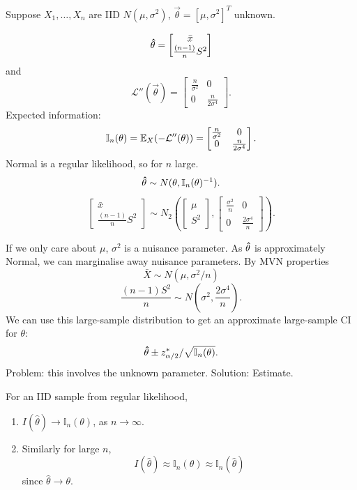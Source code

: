 \documentclass[10pt, a4paper]{article}
\begin{document}
\begin{example}
    Suppose $X_1, \dotsc, X_n$ are IID $N(\mu, \sigma ^ 2)$,
    $\vec{\theta} = [\mu, \sigma ^ 2] ^ T$ unknown.

    \[
    \mathbf{\hat{\theta}} = \begin{bmatrix}
        \bar{x} \\
        \frac{(n - 1)}{n}S ^ 2
    \end{bmatrix}
    \]
    and
    \[
    \mathcal{L}''(\vec{\theta}) = \begin{bmatrix}
        \frac{n}{\sigma ^ 2} & 0 \\ 0 & \frac{n}{2\sigma ^ 4}
    \end{bmatrix}.
    \]
    Expected information:
    \[
    \mathbb{I}_n(\mathbf{\theta}) = \mathbb{E}_{X}(-\mathcal{L}''(\mathbf{\theta})) = \begin{bmatrix}
        \frac{n}{\sigma ^ 2} & 0 \\ 0 & \frac{n}{2\sigma ^ 4}
    \end{bmatrix}.
    \]
    Normal is a regular likelihood,
    so for $n$ large.
    \[
    \mathbf{\hat{\theta}} \sim N(\mathbf{\theta}, \mathbb{I}_n(\mathbf{\theta}) ^ {-1}).
    \]
    \[
    \begin{bmatrix}
        \bar{x} \\ \frac{(n - 1)}{n}S ^ 2
    \end{bmatrix} \sim N_2\left(\begin{bmatrix}
        \mu \\ S ^ 2
    \end{bmatrix}, \begin{bmatrix}
        \frac{\sigma ^ 2}{n} & 0 \\ 0 & \frac{2\sigma ^ 4}{n}
    \end{bmatrix}\right).
    \]
\end{example}

If we only care about $\mu$,
$\sigma ^ 2$ is a nuisance parameter.
As $\mathbf{\hat{\theta}}$ is approximately Normal,
we can marginalise away nuisance parameters.
By MVN properties
\[
\bar{X} \sim N(\mu, \sigma ^ 2 / n)
\]
\[
\frac{(n - 1)S ^ 2}{n} \sim N\left(\sigma ^ 2, \frac{2\sigma ^ 4}{n}\right).
\]
We can use this large-sample distribution to get an approximate large-sample CI for $\theta$:
\[
\mathbf{\hat{\theta}} \pm z_{\alpha / 2}^{*} / \sqrt{\mathbb{I}_n(\mathbf{\theta})}.
\]
Problem:
this involves the unknown parameter.
Solution:
Estimate.

\begin{proposition}
    For an IID sample from regular likelihood,
    \begin{enumerate}[label = (\roman*)]
        \item $I(\hat{\theta}) \to \mathbb{I}_n(\theta)$,
        as $n \to \infty$.

        \item Similarly for large $n$,
        \[
        I(\hat{\theta}) \approx \mathbb{I}_n(\theta) \approx \mathbb{I}_n(\hat{\theta})
        \]
        since $\hat{\theta} \to \theta$.
    \end{enumerate}
\end{proposition}
\end{document}

